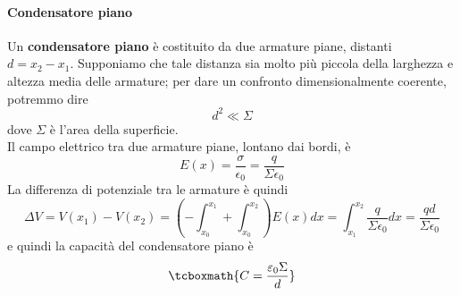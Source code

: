\paragraph{Condensatore piano}
Un \textbf{condensatore piano} è costituito da due armature piane, distanti $d=x_2-x_1$. Supponiamo che tale distanza sia molto più piccola della larghezza e altezza media delle armature; per dare un confronto dimensionalmente coerente, potremmo dire
\begin{equation}
	d^2\ll \Sigma
\end{equation}
dove $\Sigma$ è l'area della superficie.\\
Il campo elettrico tra due armature piane, lontano dai bordi, è%
\begin{equation*}
	E(x)=\frac{\sigma}{\epsilon_0}=\frac{q}{\Sigma \epsilon_0}
\end{equation*}
La differenza di potenziale tra le armature è quindi
\begin{equation*}
	\Delta V=V(x_1)-V(x_2)=\left(-\int_{x_0}^{x_1}+\int_{x_0}^{x_2}\right)E(x)dx=\int_{x_1}^{x_2}\frac{q}{\Sigma \epsilon_0}dx=\frac{qd}{\Sigma \epsilon_0}
\end{equation*}
e quindi la capacità del condensatore piano è
\begin{equation}
	\tcboxmath{C=\frac{\epsilon_0\Sigma}{d}}
\end{equation}
